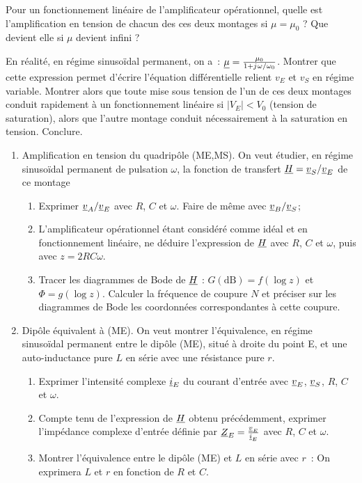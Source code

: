 \begin{exercice}
Pour un fonctionnement linéaire de l'amplificateur opérationnel, quelle est l'amplification en tension de chacun des ces deux montages si \(\mu = \mu_0\) ? Que devient elle si \(\mu\) devient infini ?

En réalité, en régime sinusoïdal permanent, on a~: \(\underline{\mu} = \frac{\mu_0}{1+{j\mkern1mu} \omega/\omega_0}\). Montrer que cette expression permet d'écrire l'équation différentielle relient \(v_E\) et \(v_S\) en régime variable. Montrer alors que toute mise sous tension de l'un de ces deux montages conduit rapidement à un fonctionnement linéaire si \(\mid V_E \mid < V_0\) (tension de saturation), alors que l'autre montage conduit nécessairement à la saturation en tension. Conclure.
\end{exercice}
\begin{exercice}
\begin{enumerate}
  \item Amplification en tension du quadripôle (ME,MS). On veut étudier, en régime sinusoïdal permanent de pulsation \(\omega\), la fonction de transfert \(\underline{H} = \underline{v}_S / \underline{v}_E\) de ce montage
  \begin{enumerate}
    \item Exprimer \(\underline{v}_A/\underline{v}_E\) avec \(R\), \(C\) et \(\omega\). Faire de même avec \(\underline{v}_B/\underline{v}_S\);
    \item L'amplificateur opérationnel étant considéré comme idéal et en fonctionnement linéaire, ne déduire l'expression de \(\underline{H}\) avec \(R\), \(C\) et \(\omega\), puis avec \(z=2RC\omega\).
    \item Tracer les diagrammes de Bode de \(\underline{H}\) : \(G(\si{\dB}) = f(\log z)\) et \(\Phi = g(\log z)\). Calculer la fréquence de coupure \(N\) et préciser sur les diagrammes de Bode les coordonnées correspondantes à cette coupure.
  \end{enumerate}
  \item Dipôle équivalent à (ME). On veut montrer l'équivalence, en régime sinusoïdal permanent entre le dipôle (ME), situé à droite du point E, et une auto-inductance pure \(L\) en série avec une résistance pure \(r\).
  \begin{enumerate}
    \item Exprimer l'intensité complexe \(\underline{i}_E\) du courant d'entrée avec \(\underline{v}_E\), \(\underline{v}_S\), \(R\), \(C\) et \(\omega\).
    \item Compte tenu de l'expression de \(\underline{H}\) obtenu précédemment, exprimer l'impédance complexe d'entrée définie par \(\underline{Z}_E = \frac{\underline{v}_E}{\underline{i}_E}\) avec \(R\), \(C\) et \(\omega\).
    \item Montrer l'équivalence entre le dipôle (ME) et \(L\) en série avec \(r\)~: On exprimera \(L\) et \(r\) en fonction de \(R\) et \(C\).
  \end{enumerate}
\end{enumerate}
\end{exercice}
